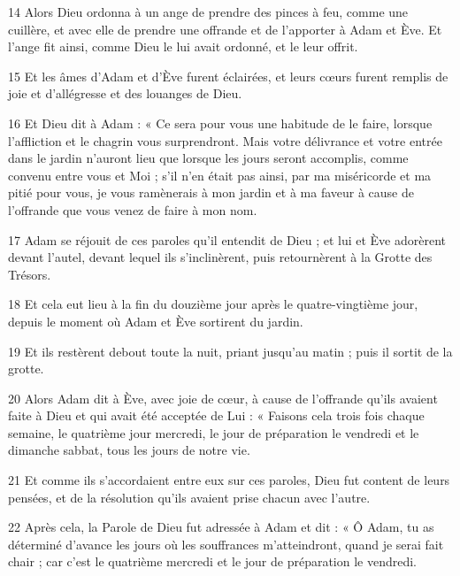 \par 14 Alors Dieu ordonna à un ange de prendre des pinces à feu, comme une cuillère, et avec elle de prendre une offrande et de l'apporter à Adam et Ève. Et l'ange fit ainsi, comme Dieu le lui avait ordonné, et le leur offrit.

\par 15 Et les âmes d'Adam et d'Ève furent éclairées, et leurs cœurs furent remplis de joie et d'allégresse et des louanges de Dieu.

\par 16 Et Dieu dit à Adam : « Ce sera pour vous une habitude de le faire, lorsque l'affliction et le chagrin vous surprendront. Mais votre délivrance et votre entrée dans le jardin n'auront lieu que lorsque les jours seront accomplis, comme convenu entre vous et Moi ; s'il n'en était pas ainsi, par ma miséricorde et ma pitié pour vous, je vous ramènerais à mon jardin et à ma faveur à cause de l'offrande que vous venez de faire à mon nom.

\par 17 Adam se réjouit de ces paroles qu'il entendit de Dieu ; et lui et Ève adorèrent devant l'autel, devant lequel ils s'inclinèrent, puis retournèrent à la Grotte des Trésors.

\par 18 Et cela eut lieu à la fin du douzième jour après le quatre-vingtième jour, depuis le moment où Adam et Ève sortirent du jardin.

\par 19 Et ils restèrent debout toute la nuit, priant jusqu'au matin ; puis il sortit de la grotte.

\par 20 Alors Adam dit à Ève, avec joie de cœur, à cause de l'offrande qu'ils avaient faite à Dieu et qui avait été acceptée de Lui : « Faisons cela trois fois chaque semaine, le quatrième jour mercredi, le jour de préparation le vendredi et le dimanche sabbat, tous les jours de notre vie.

\par 21 Et comme ils s'accordaient entre eux sur ces paroles, Dieu fut content de leurs pensées, et de la résolution qu'ils avaient prise chacun avec l'autre.

\par 22 Après cela, la Parole de Dieu fut adressée à Adam et dit : « Ô Adam, tu as déterminé d'avance les jours où les souffrances m'atteindront, quand je serai fait chair ; car c'est le quatrième mercredi et le jour de préparation le vendredi.

